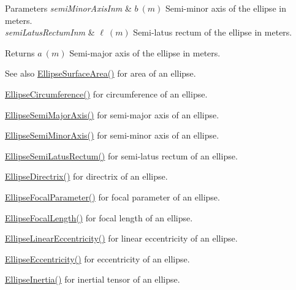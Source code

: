 \begin{DoxyParams}{Parameters}
{\em semi\+Minor\+Axis\+Inm} & $ b\ (m)$ Semi-\/minor axis of the ellipse in meters. \\
\hline
{\em semi\+Latus\+Rectum\+Inm} & $ \ell\ (m)$ Semi-\/latus rectum of the ellipse in meters. \\
\hline
\end{DoxyParams}
\begin{DoxyReturn}{Returns}
$ a\ (m)$ Semi-\/major axis of the ellipse in meters. 
\end{DoxyReturn}
\begin{DoxySeeAlso}{See also}
\mbox{\hyperlink{group___e_g_x_math-_geometry-2_d-_ellipse-_surface_area_ga4ce8c8323e9718ce5458f4ab7f6d823d}{Ellipse\+Surface\+Area()}} for area of an ellipse. 

\mbox{\hyperlink{group___e_g_x_math-_geometry-2_d-_ellipse-_circumference_ga4172802ac674eb53467b44928ac635c7}{Ellipse\+Circumference()}} for circumference of an ellipse. 

\mbox{\hyperlink{group___e_g_x_math-_geometry-2_d-_ellipse-_semi_major_axis_ga646a2ca065f4ac3f666a9ea22f3bb527}{Ellipse\+Semi\+Major\+Axis()}} for semi-\/major axis of an ellipse. 

\mbox{\hyperlink{group___e_g_x_math-_geometry-2_d-_ellipse-_semi_minor_axis_gae461acf3333565d69527dd86e9aa2b32}{Ellipse\+Semi\+Minor\+Axis()}} for semi-\/minor axis of an ellipse. 

\mbox{\hyperlink{group___e_g_x_math-_geometry-2_d-_ellipse-_semi_latus_rectum_gacfd1844eb4ef3d1ee3c0b460a6442ae6}{Ellipse\+Semi\+Latus\+Rectum()}} for semi-\/latus rectum of an ellipse. 

\mbox{\hyperlink{group___e_g_x_math-_geometry-2_d-_ellipse-_directrix_gace8f72a8efbc9c18d3eb689151405106}{Ellipse\+Directrix()}} for directrix of an ellipse. 

\mbox{\hyperlink{group___e_g_x_math-_geometry-2_d-_ellipse-_focal_parameter_ga4cd01a38c72c092ef9791351948bf69b}{Ellipse\+Focal\+Parameter()}} for focal parameter of an ellipse. 

\mbox{\hyperlink{group___e_g_x_math-_geometry-2_d-_ellipse-_focal_length_gab8d63de7640c880cfecaeada6f2afdac}{Ellipse\+Focal\+Length()}} for focal length of an ellipse. 

\mbox{\hyperlink{group___e_g_x_math-_geometry-2_d-_ellipse-_linear_eccentricity_gac70b3010e30aa8b73deb50fe2b9b9a91}{Ellipse\+Linear\+Eccentricity()}} for linear eccentricity of an ellipse. 

\mbox{\hyperlink{group___e_g_x_math-_geometry-2_d-_ellipse-_eccentricity_ga6a0a7fba17f782616894cfc447628c33}{Ellipse\+Eccentricity()}} for eccentricity of an ellipse. 

\mbox{\hyperlink{group___e_g_x_math-_geometry-2_d-_ellipse-_inertia_ga10a3049c2f04b50f271fb01dc62e4cf8}{Ellipse\+Inertia()}} for inertial tensor of an ellipse. 
\end{DoxySeeAlso}
